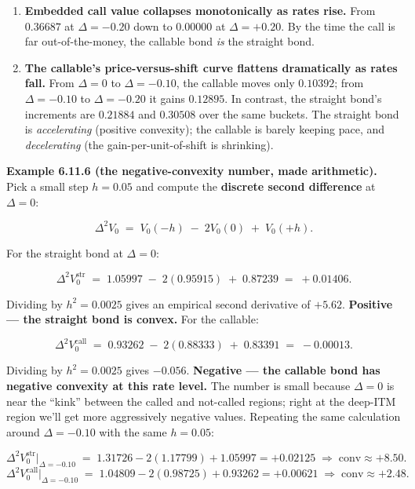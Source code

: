 \documentclass[
  10pt,
  twoside]{book}
\providecommand{\tightlist}{%
  \setlength{\itemsep}{0pt}\setlength{\parskip}{0pt}}
\begin{document}
\begin{enumerate}
\def\labelenumi{\arabic{enumi}.}
\tightlist
\item
  \textbf{Embedded call value collapses monotonically as rates rise.}
  From \(0.36687\) at \(\Delta = -0.20\) down to \(0.00000\) at
  \(\Delta = +0.20\). By the time the call is far out-of-the-money, the
  callable bond \emph{is} the straight bond.
\item
  \textbf{The callable's price-versus-shift curve flattens dramatically
  as rates fall.} From \(\Delta = 0\) to \(\Delta = -0.10\), the
  callable moves only \(0.10392\); from \(\Delta = -0.10\) to
  \(\Delta = -0.20\) it gains \(0.12895\). In contrast, the straight
  bond's increments are \(0.21884\) and \(0.30508\) over the same
  buckets. The straight bond is \emph{accelerating} (positive
  convexity); the callable is barely keeping pace, and
  \emph{decelerating} (the gain-per-unit-of-shift is shrinking).
\end{enumerate}

\textbf{Example 6.11.6 (the negative-convexity number, made
arithmetic).} Pick a small step \(h = 0.05\) and compute the
\textbf{discrete second difference} at \(\Delta = 0\):

\[\Delta^2 V_0 \;=\; V_0(-h) \;-\; 2 V_0(0) \;+\; V_0(+h).\]

For the straight bond at \(\Delta = 0\):

\[\Delta^2 V_0^{\text{str}} \;=\; 1.05997 \;-\; 2(0.95915) \;+\; 0.87239 \;=\; +0.01406.\]

Dividing by \(h^2 = 0.0025\) gives an empirical second derivative of
\(+5.62\). \textbf{Positive --- the straight bond is convex.} For the
callable:

\[\Delta^2 V_0^{\text{call}} \;=\; 0.93262 \;-\; 2(0.88333) \;+\; 0.83391 \;=\; -0.00013.\]

Dividing by \(h^2 = 0.0025\) gives \(-0.056\). \textbf{Negative --- the
callable bond has negative convexity at this rate level.} The number is
small because \(\Delta = 0\) is near the ``kink'' between the called and
not-called regions; right at the deep-ITM region we'll get more
aggressively negative values. Repeating the same calculation around
\(\Delta = -0.10\) with the same \(h = 0.05\):

\[\Delta^2 V_0^{\text{str}}\bigl|_{\Delta = -0.10}\; =\; 1.31726 - 2(1.17799) + 1.05997 = +0.02125 \;\Rightarrow\; \text{conv} \approx +8.50.\]
\[\Delta^2 V_0^{\text{call}}\bigl|_{\Delta = -0.10}\; =\; 1.04809 - 2(0.98725) + 0.93262 = +0.00621 \;\Rightarrow\; \text{conv} \approx +2.48.\]
\end{document}
